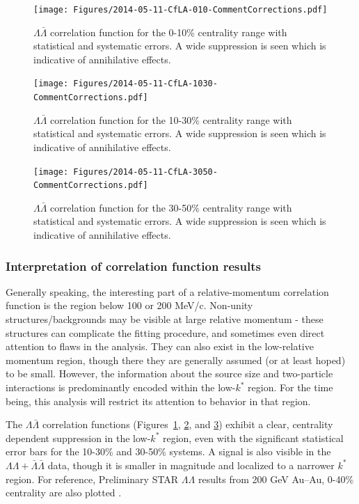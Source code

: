 \begin{figure}[hbtp]
\texttt{[image: Figures/2014-05-11-CfLA-010-CommentCorrections.pdf]}
\caption[$\Lambda\bar{\Lambda}$ correlation function for the 0-10\% centrality range]{$\Lambda\bar{\Lambda}$ correlation function for the 0-10\% centrality range with statistical and systematic errors.  
A wide suppression is seen which is indicative of annihilative effects.}
\label{fig:CFLamALam010}
\end{figure}
\begin{figure}[hbtp]
\texttt{[image: Figures/2014-05-11-CfLA-1030-CommentCorrections.pdf]}
\caption[$\Lambda\bar{\Lambda}$ correlation function for the 10-30\% centrality range]{$\Lambda\bar{\Lambda}$ correlation function for the 10-30\% centrality range with statistical and systematic errors.  
A wide suppression is seen which is indicative of annihilative effects.}
\label{fig:CFLamALam1030}
\end{figure}
\begin{figure}[hbtp]
\texttt{[image: Figures/2014-05-11-CfLA-3050-CommentCorrections.pdf]}
\caption[$\Lambda\bar{\Lambda}$ correlation function for the 30-50\% centrality range]{$\Lambda\bar{\Lambda}$ correlation function for the 30-50\% centrality range with statistical and systematic errors.  
A wide suppression is seen which is indicative of annihilative effects.}
\label{fig:CFLamALam3050}
\end{figure}

\subsubsection{Interpretation of correlation function results}
\label{sec:CFInterpretation}


Generally speaking, the interesting part of a relative-momentum correlation function is the region below 100 or 200 MeV/c.  
Non-unity structures/backgrounds may be visible at large relative momentum - these structures can complicate the fitting procedure, and sometimes even direct attention to flaws in the analysis.  
They can also exist in the low-relative momentum region, though there they are generally assumed (or at least hoped) to be small.  
However, the information about the source size and two-particle interactions is predominantly encoded within the low-$k^*$ region.  
For the time being, this analysis will restrict its attention to behavior in that region.

The $\Lambda\bar{\Lambda}$ correlation functions (Figures\ \ref{fig:CFLamALam010}, \ref{fig:CFLamALam1030}, and \ref{fig:CFLamALam3050}) exhibit a clear, centrality dependent suppression in the low-$k^*$ region, even with the significant statistical error bars for the 10-30\% and 30-50\% systems.  
A signal is also visible in the $\Lambda\Lambda + \bar{\Lambda}\bar{\Lambda}$ data, though it is smaller in magnitude and localized to a narrower $k^*$ region. 
For reference, Preliminary STAR $\Lambda\Lambda$ results from 200 GeV Au--Au, 0-40\% centrality are also plotted \cite{Shah:2012ps}.

